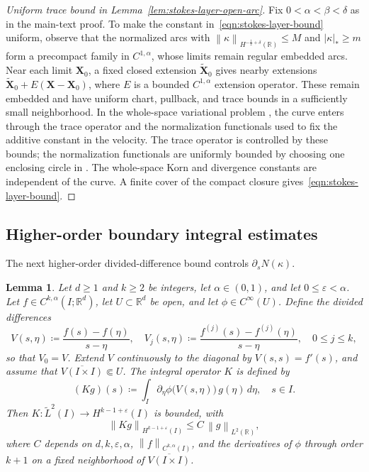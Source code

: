 \documentclass[11pt,reqno]{amsart}
\theoremstyle{plain}
\newtheorem{lemma}[theorem]{Lemma}
\theoremstyle{definition}
\numberwithin{equation}{section}
\newcommand{\p}{\partial}
\newcommand{\wt}[1]{\widetilde{#1}}
\newcommand{\bm}[1]{\boldsymbol{#1}}
\newcommand{\abs}[1]{\left\lvert #1 \right\rvert}
\newcommand{\norm}[1]{\left\lVert #1 \right\rVert}
\newcommand{\R}{\mathbb{R}}
\newcommand{\hi}[1]{H^{#1}(I)}
\newcommand{\hr}[1]{H^{#1}(\R)}
\begin{document}
\begin{proof}[Uniform trace bound in Lemma~\ref{lem:stokes-layer-open-arc}]
Fix $0<\alpha<\beta<\delta$ as in the main-text proof.
To make the constant in~\eqref{eqn:stokes-layer-bound} uniform, observe that the normalized arcs with
$\norm{\kappa}_{\hr{-\frac12+\delta}}\le M$ and $\abs{\kappa}_*\ge m$
form a precompact family in $C^{1,\alpha}$, whose limits remain regular
embedded arcs. Near each limit $\bm X_0$, a fixed closed extension
$\wt{\bm X}_0$ gives nearby extensions
$\wt{\bm X}_0+E(\bm X-\bm X_0)$, where $E$ is a bounded
$C^{1,\alpha}$ extension operator. These remain embedded and have uniform
chart, pullback, and trace bounds in a sufficiently small neighborhood.
In the whole-space variational problem
\cite[Proposition~7.1]{SayasSelgas2014}, the curve enters through the
trace operator and the normalization functionals used to fix the additive
constant in the velocity. The trace operator is controlled by these bounds;
the normalization functionals are uniformly bounded by choosing one enclosing circle in
\cite[(7.2)--(7.4)]{SayasSelgas2014}. The whole-space Korn and divergence
constants are independent of the curve. A finite cover of the compact
closure gives~\eqref{eqn:stokes-layer-bound}.
\end{proof}

\subsection{Higher-order boundary integral estimates}
\label{app:higher-order-estimates}

The next higher-order divided-difference bound controls
$\p_s N(\kappa)$.

\begin{lemma}\label{lem:K-higher-order}
Let $d\ge1$ and $k\ge2$ be integers, let
$\alpha\in(0,1)$, and let $0\le\varepsilon<\alpha$. Let
$f\in C^{k,\alpha}(I;\R^d)$, let
$U\subset\R^d$ be open, and let $\phi\in C^\infty(U)$. Define the divided
differences
\begin{equation}\label{eq:Vj-def}
    V(s,\eta) \coloneqq \frac{f(s)-f(\eta)}{s-\eta},
    \quad
    V_j(s,\eta) \coloneqq \frac{f^{(j)}(s)-f^{(j)}(\eta)}{s-\eta},
    \quad 0\le j\le k,
\end{equation}
so that $V_0 = V$. Extend $V$ continuously to the diagonal by
$V(s,s)=f'(s)$, and assume that
$\overline{V(I\times I)}\Subset U$. The integral operator $K$ is defined by
\begin{equation}\label{eq:K-def}
    (K g)(s) \coloneqq \int_I \p_\eta\phi\bigl(V(s,\eta)\bigr)\,g(\eta)\,d\eta,
    \quad s\in I.
\end{equation}
Then $K:\wt L^2(I)\to\hi{k-1+\varepsilon}$ is bounded, with
\begin{equation}\label{eq:K-bound}
    \norm{K g}_{\hi{k-1+\varepsilon}}
    \le C\,\norm{g}_{L^2(\R)},
\end{equation}
where $C$ depends on $d,k,\varepsilon,\alpha$,
$\norm{f}_{C^{k,\alpha}(I)}$, and the derivatives of $\phi$
through order $k+1$ on a fixed neighborhood of
$\overline{V(I\times I)}$.
\end{lemma}
\end{document}
